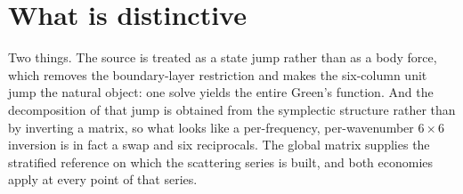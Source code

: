 \documentclass[11pt,a4paper]{article}
\begin{document}
\section{What is distinctive}

Two things. The source is treated as a state jump rather than as a body force,
which removes the boundary-layer restriction and makes the six-column unit jump
the natural object: one solve yields the entire Green's function. And the
decomposition of that jump is obtained from the symplectic structure rather than
by inverting a matrix, so what looks like a per-frequency, per-wavenumber
$6\times6$ inversion is in fact a swap and six reciprocals. The global matrix
supplies the stratified reference on which the scattering series is built, and
both economies apply at every point of that series.
\end{document}

